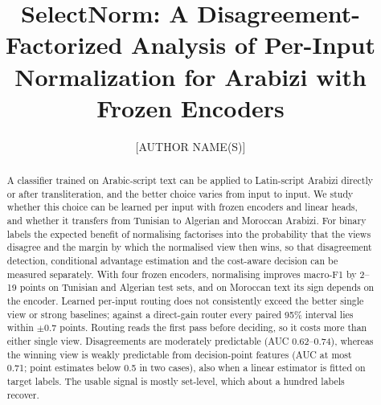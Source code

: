 \documentclass[runningheads]{llncs}
\begin{document}
%
\title{SelectNorm: A Disagreement-Factorized Analysis of Per-Input Normalization for Arabizi with Frozen Encoders}
%
\author{[AUTHOR NAME(S)]\orcidID{[ORCID]}}
\authorrunning{[AUTHOR(S)]}
%
\maketitle
%
\begin{abstract}
A classifier trained on Arabic-script text can be applied to Latin-script Arabizi directly or after transliteration, and the better choice varies from input to input. We study whether this choice can be learned per input with frozen encoders and linear heads, and whether it transfers from Tunisian to Algerian and Moroccan Arabizi. For binary labels the expected benefit of normalising factorises into the probability that the views disagree and the margin by which the normalised view then wins, so that disagreement detection, conditional advantage estimation and the cost-aware decision can be measured separately. With four frozen encoders, normalising improves macro-F1 by 2--19 points on Tunisian and Algerian test sets, and on Moroccan text its sign depends on the encoder. Learned per-input routing does not consistently exceed the better single view or strong baselines; against a direct-gain router every paired 95\% interval lies within $\pm0.7$ points. Routing reads the first pass before deciding, so it costs more than either single view. Disagreements are moderately predictable (AUC 0.62--0.74), whereas the winning view is weakly predictable from decision-point features (AUC at most 0.71; point estimates below 0.5 in two cases), also when a linear estimator is fitted on target labels. The usable signal is mostly set-level, which about a hundred labels recover.

\end{abstract}
%








%


%
\appendix

\end{document}
